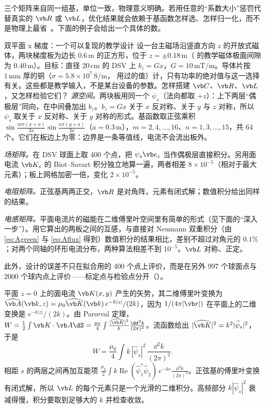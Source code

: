 三个矩阵来自同一组基，单位一致，物理意义明确。若用任意的“系数大小”惩罚代替真实的 $\vb R$ 或 $\vb L$，优化结果就会依赖于基函数怎样选、怎样归一化，而不是物理上最省~\cite{bfieldtheory,bfieldsoftware}。下面的例子会给出一个具体的数。

\begin{example}[label=ex:coils-biplanar]{双平面 x 梯度：一个可以复现的教学设计}
设一台主磁场沿竖直方向 $z$ 的开放式磁体，两块梯度板为边长 $0.6\,\mathrm m$ 的正方形，位于 $z=\pm0.18\,\mathrm m$（ 的教学磁体极面间隙为 $0.40\,\mathrm m$）。目标：直径 $20\,\mathrm{cm}$ 的 DSV 上 $b_z=Gx$，$G=10\,\mathrm{mT/m}$。导体片按 $1\,\mathrm{mm}$ 厚的铜（$\sigma=5.8\times10^7\,\mathrm{S/m}$， 用过的值）计，只有功率的绝对值与这一选择有关。这些都是教学输入，不是某台设备的参数。怎样搭建 $\vb C$、$\vb R$、$\vb L$，又怎样检验它们？
\solution
\emph{源空间。}两块板用同一个 $\psi_s$（法向都取 $+z$）：上下两层“偶极层”同向，在中间叠加出 $b_z$。$b_z=Gx$ 关于 $x$ 反对称、关于 $y$ 与 $z$ 对称，所以 $\psi_s$ 取关于 $x$ 反对称、关于 $y$ 对称的形式。基函数取正弦乘积 $\sin\frac{m\pi(x+a)}{2a}\sin\frac{n\pi(y+a)}{2a}$（$a=0.3\,\mathrm m$），$m=2,4,\dots,16$、$n=1,3,\dots,15$，共 64 个。它们在板边上为零：边界是一条等值线，电流不会流出板外。

\emph{场矩阵。}在 DSV 球面上取 400 个点，把 $\psi_s\vb e_z$ 当作偶极层直接积分。另用面电流 $\vb K_s$ 的 Biot--Savart 积分独立地算一遍，两者相差 $8\times10^{-5}$（相对于最大元素）；板上网格加密一倍，变化 $2\times10^{-5}$。

\emph{电阻矩阵。}正弦基两两正交，$\vb R$ 是对角阵，元素有闭式解；数值积分给出同样的结果。

\emph{电感矩阵。}平面电流片的磁能在二维傅里叶空间里有简单的形式（见下面的“深入一步”）。用它算出的两板之间的互感，与直接对 Neumann 双重积分（由 \eqref{eq:Agreen} 与 \eqref{eq:Aflux} 得到）数值积分的结果相比，差别不超过对角元的 $0.1\%$；对两个同轴的环形电流分布，两种算法相差不到 $10^{-5}$。$\vb L$ 对称、正定。

此外，设计的误差不只在拟合用的 400 个点上评价，而是在另外 997 个球面点与 2000 个球内点上评价——标定点与检验点分开（）。
\end{example}

\begin{deeper}[平面电流片的磁能]
平面 $z=0$ 上的面电流 $\vb K(x,y)$ 产生的矢势，其二维傅里叶变换为 $\widehat{\vb A}(\vb k,z)=\mu_0\widehat{\vb K}(\vb k)\,e^{-k|z|}/(2k)$，因为 $1/(4\pi|\vb r|)$ 在平面上的二维变换是 $e^{-k|z|}/(2k)$。由 Parseval 定理，$W=\tfrac12\int\vb K\cdot\vb A\dS=\frac{\mu_0}{4}\int\frac{|\widehat{\vb K}|^2}{k}\frac{\dd^2k}{(2\pi)^2}$。流函数给出 $|\widehat{\vb K}|^2=k^2|\widehat\psi_s|^2$，于是
\begin{equation*}
W=\frac{\mu_0}{4}\int k\,|\widehat\psi_s|^2\,\frac{\dd^2k}{(2\pi)^2}.
\end{equation*}
相距 $s$ 的两层之间再加互能项 $\frac{\mu_0}{2}\int k\operatorname{Re}(\widehat\psi_1^*\widehat\psi_2)\,e^{-ks}\frac{\dd^2k}{(2\pi)^2}$。正弦基的傅里叶变换有闭式解，所以 $\vb L$ 的每个元素只是一个光滑的二维积分。高频部分 $k|\widehat\psi_s|^2$ 衰减得慢，积分要取到足够大的 $k$ 并检查收敛。
\end{deeper}

